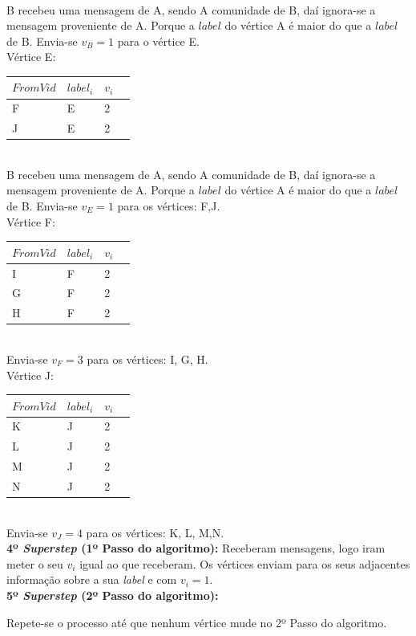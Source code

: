 \documentclass[a4paper,10pt]{report}
\begin{document}
\\[0.25cm]
  B recebeu uma mensagem de A, sendo A comunidade de B, daí ignora-se a mensagem 
proveniente de A. Porque a $label$ do vértice A é maior do que a $label$ 
de B.
  Envia-se $v_B = 1$ para o vértice E.
\\[0.25cm]
Vértice E:
  \begin{tabular}{| l | l | l | l |}
  \hline
  $From Vid$ & $label_i$ & $v_i$ \\ \hline
  F & E & 2 \\ \hline
  J & E & 2 \\ \hline
  \end{tabular}  
\\[0.25cm]
  B recebeu uma mensagem de A, sendo A comunidade de B, daí ignora-se a 
mensagem 
proveniente de A. Porque a $label$ do vértice A é maior do que a $label$ 
de B.
  Envia-se $v_E = 1$ para os vértices: F,J.
\\[0.25cm]
Vértice F:
  \begin{tabular}{| l | l | l | l |}
  \hline
  $From Vid$ & $label_i$ & $v_i$ \\ \hline
  I & F & 2 \\ \hline
  G & F & 2 \\ \hline
  H & F & 2 \\ \hline
  \end{tabular}  
\\[0.25cm]
  Envia-se $v_F = 3$ para os vértices: I, G, H.
\\[0.25cm]
Vértice J:
  \begin{tabular}{| l | l | l | l |}
  \hline
  $From Vid$ & $label_i$ & $v_i$ \\ \hline
  K & J & 2 \\ \hline
  L & J & 2 \\ \hline
  M & J & 2 \\ \hline
  N & J & 2 \\ \hline
  \end{tabular}  
\\[0.25cm]
  Envia-se $v_J = 4$ para os vértices: K, L, M,N.
\\[0.25cm]
{\bf 4º \textit{Superstep} (1º Passo do algoritmo):}
Receberam mensagens, logo iram meter o seu $v_i$ igual ao que receberam.
Os vértices enviam para os seus adjacentes 
informação sobre a sua \textit{label} e com $v_i=1$.
\\[0.25cm] 
{\bf 5º \textit{Superstep} (2º Passo do algoritmo):}

Repete-se o processo até que nenhum vértice mude no 2º Passo do algoritmo.
\end{document}
